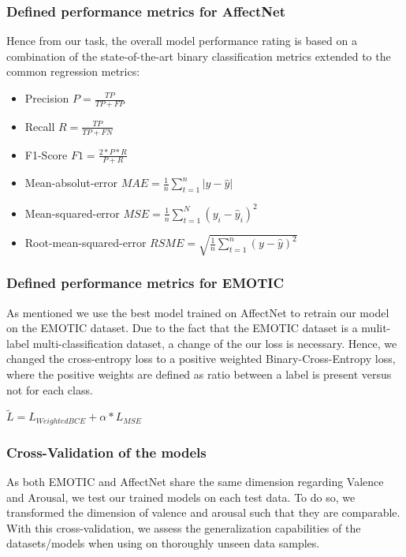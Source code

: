 \documentclass[conference]{IEEEtran}
\begin{document}
\subsubsection{Defined performance metrics for AffectNet}

Hence from our task, the overall model performance rating is based on a combination of the state-of-the-art binary classification metrics extended to the common regression metrics:

\begin{itemize}
\setlength\itemsep{0.5em}
\item Precision $P = \frac{TP}{TP + FP}$
\item Recall $R = \frac{TP}{TP + FN}$
\item F1-Score $F1 = \frac{2*P*R}{P+R}$
\item Mean-absolut-error $MAE =\frac{1}{n}\sum_{t=1}^{n}|y- \hat{y}|$
\item Mean-squared-error $MSE = \frac{1}{n} \sum_{t=1}^{N} (y_i - \hat{y}_i)^2$
\item Root-mean-squared-error $RSME =\sqrt{\frac{1}{n}\sum_{t=1}^{n}(y-\hat{y})^2}$
\end{itemize}

\subsubsection{Defined performance metrics for EMOTIC}
As mentioned we use the best model trained on AffectNet to retrain our model on the EMOTIC dataset. Due to the fact that the EMOTIC dataset is a mulit-label multi-classification dataset, a change of the our loss is necessary. Hence, we changed the cross-entropy loss to a positive weighted Binary-Cross-Entropy loss, where the positive weights are defined as ratio between a label is present versus not for each class.

\begin{center}
\begin{math}
\tilde{L} = L_{WeightedBCE} + \alpha * L_{MSE}
\end{math}
\end{center}

\subsubsection{Cross-Validation of the models}

As both EMOTIC and AffectNet share the same dimension regarding Valence and Arousal, we test our trained models on each test data. To do so, we transformed the dimension of valence and arousal such that they are comparable. With this cross-validation, we assess the generalization capabilities of the datasets/models when using on thoroughly unseen data samples.
\end{document}

